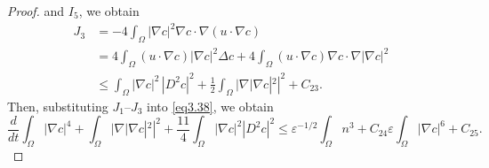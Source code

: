 \documentclass[reqno]{amsart}
\begin{document}
\begin{proof}
and $I_5$, we obtain
\begin{align*}
J_3 
&= - 4 \int_{\Omega} |\nabla c|^2 \nabla c \cdot \nabla (u \cdot \nabla c) \\&=4 \int_{\Omega} (u \cdot \nabla c) |\nabla c|^2 \Delta c
+ 4 \int_{\Omega} (u \cdot \nabla c) \nabla c \cdot \nabla |\nabla c|^2\\
&\leq \int_{\Omega} |\nabla c|^2 \, |D^2 c|^2 + \frac{1}{2} \int_{\Omega} |\nabla |\nabla c|^2|^2 + C_{23}.
\end{align*}
Then, substituting $J_1$--$J_3$ into \eqref{eq3.38}, we obtain
\begin{equation}\label{(3.57)}
\frac{d}{dt} \int_{\Omega} |\nabla c|^4
+ \int_{\Omega} |\nabla |\nabla c|^2|^2
+ \frac{11}{4}\int_{\Omega} |\nabla c|^2 |D^2 c|^2 
\leq \varepsilon^{-1/2}\int_{\Omega} n^3+ C_{24}\varepsilon\int_{\Omega} |\nabla c|^6
+ C_{25}.
\end{equation}


\end{proof}
\end{document}
